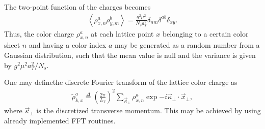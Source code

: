 \newpage

\begin{note}
The two-point function of the charges becomes
\begin{align*}
    \left\langle\rho_{x, n}^{a} \rho_{y, m}^{b}\right\rangle=\frac{g^{2} \mu^{2}}{N_{s} a_T^2} \delta_{n m} \delta^{a b} \delta_{x y}.
\end{align*}
Thus, the color charge $\rho_{x,n}^a$ at each lattice point $x$ belonging to a certain color sheet $n$ and having a color index $a$ may be generated as a random number from a Gaussian distribution, such that the mean value is null and the variance is given by $g^2\mu^2a_T^2/N_s$.
\end{note}

\begin{note}
One may definethe discrete Fourier transform of the lattice color charge as
\begin{align*}
    \widetilde{\rho}_{k,x}^a\overset{\Delta}{=}\left(\frac{2\pi}{L_T}\right)^2\sum\limits_{\vec{\kappa}_\perp}\rho_{x,n}^a\exp{-i\vec{\kappa}_\perp\cdot\vec{x}_\perp},
\end{align*}
where $\vec{\kappa}_\perp$ is the discretized transverse momentum. This may be achieved by using already implemented {\sffamily FFT} routines.
\end{note}

\vspace{0.3cm}

